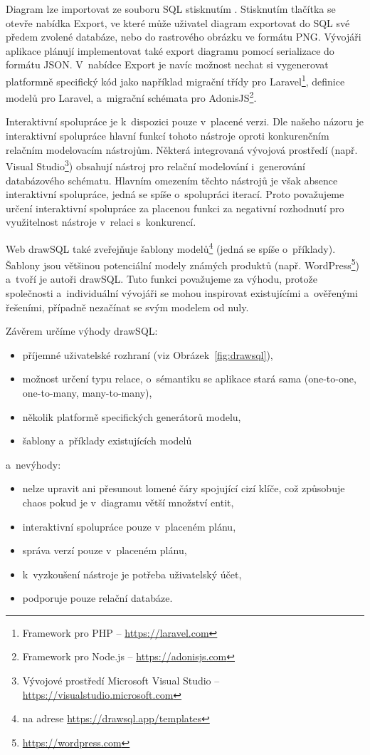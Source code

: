 Diagram lze importovat ze souboru SQL stisknutím .
Stisknutím tlačítka  se otevře nabídka Export, ve které může uživatel diagram exportovat do SQL své předem zvolené databáze, nebo do rastrového obrázku ve formátu PNG.
Vývojáři aplikace plánují implementovat také export diagramu pomocí serializace do formátu JSON.
V~nabídce Export je navíc možnost nechat si vygenerovat platformně specifický kód jako například migrační třídy pro
Laravel\footnote{Framework pro PHP -- \url{https://laravel.com}},
definice modelů pro Laravel, a~migrační schémata pro
AdonisJS\footnote{Framework pro Node.js -- \url{https://adonisjs.com}}.

Interaktivní spolupráce je k~dispozici pouze v~placené verzi.
Dle našeho názoru je interaktivní spolupráce hlavní funkcí tohoto nástroje oproti konkurenčním relačním modelovacím nástrojům.
Některá integrovaná vývojová prostředí (např. Visual Studio\footnote{Vývojové prostředí Microsoft Visual Studio -- \url{https://visualstudio.microsoft.com}}) obsahují nástroj pro relační modelování i~generování databázového schématu.
Hlavním omezením těchto nástrojů je však absence interaktivní spolupráce, jedná se spíše o~spolupráci iterací.
Proto považujeme určení interaktivní spolupráce za placenou funkci za negativní rozhodnutí pro využitelnost nástroje v~relaci s~konkurencí.

Web drawSQL také zveřejňuje šablony modelů\footnote{na adrese \url{https://drawsql.app/templates}} (jedná se spíše o~příklady).
Šablony jsou většinou potenciální modely známých produktů (např. WordPress\footnote{\url{https://wordpress.com}}) a~tvoří je autoři drawSQL.
Tuto funkci považujeme za výhodu, protože společnosti a~individuální vývojáři se mohou inspirovat existujícími a~ověřenými řešeními, případně nezačínat se svým modelem od nuly.

Závěrem určíme výhody drawSQL:
\begin{itemize}
  \item příjemné uživatelské rozhraní (viz Obrázek~\ref{fig:drawsql}),
  \item možnost určení typu relace, o~sémantiku se aplikace stará sama (one-to-one, one-to-many, many-to-many),
  \item několik platformě specifických generátorů modelu,
  \item šablony a~příklady existujících modelů
\end{itemize}
a~nevýhody:
\begin{itemize}
  \item nelze upravit ani přesunout lomené čáry spojující cizí klíče, což způsobuje chaos pokud je v~diagramu větší množství entit,
  \item interaktivní spolupráce pouze v~placeném plánu,
  \item správa verzí pouze v~placeném plánu,
  \item k~vyzkoušení nástroje je potřeba uživatelský účet,
  \item podporuje pouze relační databáze.
\end{itemize}

